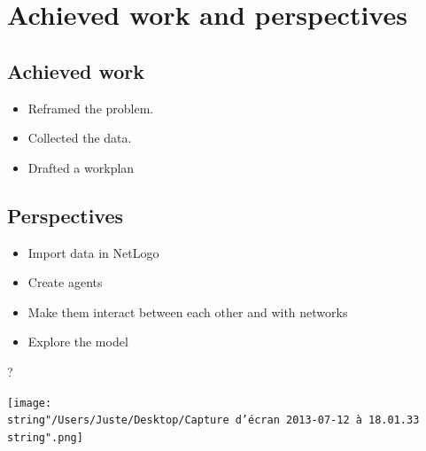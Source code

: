\documentclass[english]{beamer}
\def\lyxframeend{} %
\begin{document}
\lyxframeend{}\section{Achieved work and perspectives}


\lyxframeend{}\subsection{Achieved work}


\lyxframeend{}
\begin{itemize}
\item Reframed the problem.


\pause{}

\item Collected the data.


\pause{}

\item Drafted a workplan
\end{itemize}

\lyxframeend{}\subsection{Perspectives}


\lyxframeend{}
\begin{itemize}
\item Import data in NetLogo


\pause{}

\item Create agents


\pause{}

\item Make them interact between each other and with networks


\pause{}

\item Explore the model
\end{itemize}

\lyxframeend{}

{\LARGE \hfill{}?\hfill{}\hfill{}}{\LARGE \par}

{\LARGE \hfill{}}\texttt{[image: \\string"/Users/Juste/Desktop/Capture d’écran 2013-07-12 à 18.01.33\\string".png]}{\LARGE \hfill{}\hfill{}}{\LARGE \par}


\lyxframeend{}
\end{document}
